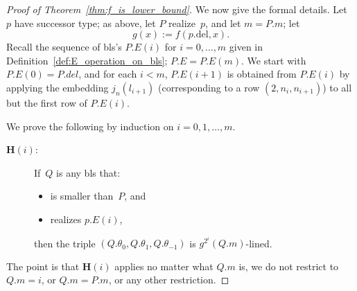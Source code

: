 \documentclass{article}
\theoremstyle{definition}
\theoremstyle{remark}
\begin{document}
\begin{proof}[Proof of Theorem~\ref{thm:f_is_lower_bound}]

    \medskip

    We now give the formal details. Let~$p$ have successor type; as above, let $P$ realize~$p$, and let $m = P.m$; let
    \[
    g(x):=f(p.\mathrm{del},x).
    \]
    Recall the sequence of bls's $P.E(i)$ for $i=0,\dots, m$ given in Definition~\ref{def:E_operation_on_bls}; $P.E = P.E(m)$. We start with $P.E(0) = P.del$, and for each $i<m$, $P.E(i+1)$ is obtained from $P.E(i)$ by applying the embedding $j_n(l_{i+1})$ (corresponding to a row $(2,n_i,n_{i+1})$) to all but the first row of $P.E(i)$. 

    We prove the following by induction on $i=0,1,\dots, m$. 

    \begin{description}
    \item[$\mathbf{H}(i)$:] If~$Q$ is any bls that:
    \begin{itemize}
      \item is smaller than~$P$, and 
      \item realizes $p.E(i)$, 
    \end{itemize}
    then the triple $(Q.\theta_0,Q.\theta_1,Q.\theta_{-1})$ is $g^{2^i}(Q.m)$-lined.
    \end{description}

    The point is that $\mathbf{H}(i)$ applies no matter what $Q.m$ is, we do not restrict to $Q.m = i$, or $Q.m = P.m$, or any other restriction. 


\end{proof}
\end{document}
